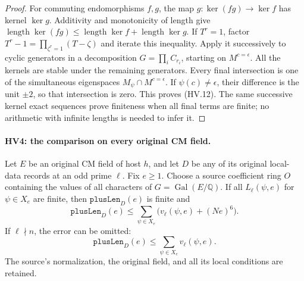 \begin{proof}
For commuting endomorphisms $f,g$, the map
$g:\ker(fg)\to\ker f$ has kernel $\ker g$.
Additivity and monotonicity of length give
$\operatorname{length}\ker(fg)\le
\operatorname{length}\ker f+\operatorname{length}\ker g$.
If $T^r=1$, factor
$T^r-1=\prod_{\zeta^r=1}(T-\zeta)$ and iterate this inequality.
Apply it successively to cyclic generators in a decomposition
$G=\prod_i C_{r_i}$, starting on $M^{c=\epsilon}$.
All the kernels are stable under the remaining generators.
Every final intersection is one of the simultaneous
eigenspaces $M_\psi\cap M^{c=\epsilon}$.
If $\psi(c)\ne\epsilon$, their difference is the unit $\pm2$,
so that intersection is zero.  This proves (HV.12).
The same successive kernel exact sequences prove finiteness
when all final terms are finite; no arithmetic with infinite
lengths is needed to infer it.
\end{proof}

\paragraph{HV4: the comparison on every original CM field.}
\label{claim:HV4}
Let $E$ be an original CM field of host $h$, and let $D$ be
any of its original local-data records at an odd prime $\ell$.
Fix $e\ge1$.
Choose a source coefficient ring $O$ containing the values of
all characters of $G=\operatorname{Gal}(E/\mathbb Q)$.
If all $L_\ell(\psi,e)$ for $\psi\in X_e$ are finite, then
$\mathtt{plusLen}_D(e)$ is finite and
\[
 \mathtt{plusLen}_D(e)
 \le\sum_{\psi\in X_e}
                 \bigl(v_\ell(\psi,e)+(Ne)^6\bigr).
 \tag{HV.13}
\]
If $\ell\nmid n$, the error can be omitted:
\[
             \mathtt{plusLen}_D(e)
                     \le\sum_{\psi\in X_e}v_\ell(\psi,e).
 \tag{HV.14}
\]
The source's normalization, the original field, and all its
local conditions are retained.

